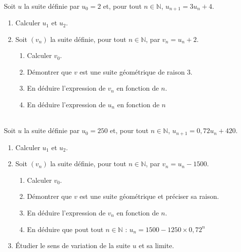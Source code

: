 \documentclass[main.tex]{subfiles}
\begin{document}
%	 
\begin{exercise}\label{chapter05:exercise:suites32} \hfill \\
Soit $u$ la suite définie par $u_0=2$ et, pour tout $n \in \mathbb{N}$, $u_{n+1}=3u_n+4$.
\begin{enumerate}[label=\arabic*),leftmargin=*] 
	\item Calculer $u_1$ et $u_2$.
	\item Soit $(v_n)$ la suite définie, pour tout $n \in \mathbb{N}$, par $v_n = u_n +2$.
	\begin{enumerate}[label=\alph*),leftmargin=*] 
		\item Calculer $v_0$.
		\item Démontrer que $v$ est une suite géométrique de raison $3$.
		\item En déduire l'expression de $v_n$ en fonction de $n$.
		\item En déduire l'expression de $u_n$ en fonction de $n$ 
	\end{enumerate}
\end{enumerate}
\end{exercise} 
\begin{exercise}\label{chapter05:exercise:suites33} \hfill \\
	Soit $u$ la suite définie par $u_0=250$ et, pour tout $n \in \mathbb{N}$, $u_{n+1} = 0,72u_{n} +420$.
	\begin{enumerate}[label=\arabic*),leftmargin=*] 
		\item Calculer $u_1$ et $u_2$.
		\item Soit $(v_n)$ la suite définie, pour tout $n \in \mathbb{N}$, par $v_n = u_n -1500$.
		\begin{enumerate}[label=\alph*),leftmargin=*] 
			\item Calculer $v_0$.
			\item Démontrer que $v$ est une suite géométrique et préciser sa raison.
			\item En déduire l'expression de $v_n$ en fonction de $n$.
			\item En déduire que pout tout $n\in\mathbb{N}$ : $u_{n} = 1500 -1250\times  0,72^n$
		\end{enumerate}
		\item Étudier le sens de variation de la suite $u$  et sa limite.
	\end{enumerate}
\end{exercise}  
\end{document}

